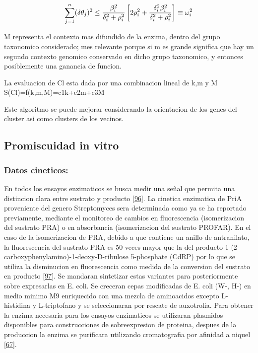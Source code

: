 \documentclass[12pt,twoside]{reedthesis}
\begin{document}
  \[\sum_{j=1}^n (\delta\theta_j)^2 \leq {{\beta_i^2}\over{\delta_i^2 + \rho_i^2}}
  \left[ 2\rho_i^2 + {\delta_i^2\beta_i^2\over{\delta_i^2 + \rho_i^2}} \right] \equiv \omega_i^2\]
  
  M representa el contexto mas difundido de la enzima, dentro del grupo
  taxonomico considerado; mes relevante porque si m es grande significa
  que hay un segundo contexto genomico conservado en dicho grupo
  taxonomico, y entonces posiblemente una ganancia de funcion.
  
  La evaluacion de Cl esta dada por una combinacion lineal de k,m y M\\
  S(Cl)=f(k,m,M)=c1k+c2m+c3M
  
  Este algoritmo se puede mejorar considerando la orientacion de los genes
  del cluster asi como clusters de los vecinos.
  
  \subsection{Promiscuidad in vitro}\label{promiscuidad-in-vitro}
  
  \subsubsection{Datos cineticos:}\label{datos-cineticos}
  
  En todos los ensayos enzimaticos se busca medir una señal que permita
  una distincion clara entre sustrato y producto
  {[}\protect\hyperlink{ref-bisswanger_general_2011}{96}{]}. La cinetica
  enzimatica de PriA proveniente del genero Streptomyces sera determinada
  como ya se ha reportado previamente, mediante el monitoreo de cambios en
  fluorescencia (isomerizacion del sustrato PRA) o en absorbancia
  (isomerizacion del sustrato PROFAR). En el caso de la isomerizacion de
  PRA, debido a que contiene un anillo de antranilato, la fluorescencia
  del sustrato PRA es 50 veces mayor que la del producto
  1-(2-carboxyphenylamino)-1-deoxy-D-ribulose 5-phosphate (CdRP) por lo
  que se utiliza la disminucion en fluorescencia como medida de la
  conversion del sustrato en producto
  {[}\protect\hyperlink{ref-hommel_phosphoribosyl_1995}{97}{]}. Se
  mandaran sintetizar estas variantes para posteriormente sobre
  expresarlas en E. coli. Se creceran cepas modificadas de E. coli (W-,
  H-) en medio minimo M9 enriquecido con una mezcla de aminoacidos excepto
  L-histidina y L-triptofano y se seleccionaran por rescate de auxotrofia.
  Para obtener la enzima necesaria para los ensayos enzimaticos se
  utilizaran plasmidos disponibles para construcciones de sobreexpresion
  de proteina, despues de la produccion la enzima se purificara utilizando
  cromatografia por afinidad a niquel
  {[}\protect\hyperlink{ref-verduzco-castro_co-occurrence_2016}{67}{]}.
  
\end{document}
